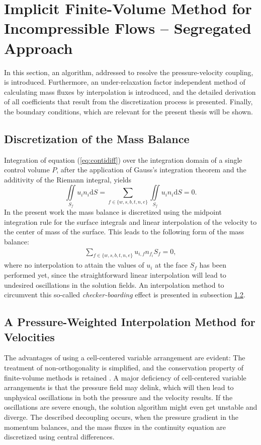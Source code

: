\section{Implicit Finite-Volume Method for Incompressible Flows -- Segregated Approach}
\label{sec:seg}
In this section, an algorithm, addressed to resolve the pressure-velocity coupling, is introduced. Furthermore, an under-relaxation factor independent method of calculating mass fluxes by interpolation is introduced, and the detailed derivation of all coefficients that result from the discretization process is presented. Finally, the boundary conditions, which are relevant for the present thesis will be shown.

\subsection{Discretization of the Mass Balance}

Integration of equation (\ref{eq:contidiff}) over the integration domain of a single control volume \(P\), after the application of Gauss's integration theorem and the additivity of the Riemann integral, yields
\begin{displaymath}
  \iint\limits_{S_f} u_i n_i \mathrm{d}S = \sum_{f \in \{w,s,b,t,n,e\}} \iint\limits_{S_f} u_i n_{i} \mathrm{d}S = 0.
\end{displaymath}
In the present work the mass balance is discretized using the midpoint integration rule for the surface integrals and linear interpolation of the velocity to the center of mass of the surface. This leads to the following form of the mass balance:
\begin{align}
  \label{eq:massbalance}
  \sum_{f \in \{w,s,b,t,n,e\}} u_{i,f} n_{f_i} S_f = 0,
\end{align}
where no interpolation to attain the values of \(u_i\) at the face \(S_f\) has been performed yet, since the straightforward linear interpolation will lead to undesired oscillations in the solution fields. An interpolation method to circumvent this so-called \emph{checker-boarding} effect is presented in subsection \ref{sec:massflux}.

\subsection{A Pressure-Weighted Interpolation Method for Velocities}
\label{sec:massflux}

The advantages of using a cell-centered variable arrangement are evident: The treatment of non-orthogonality is simplified, and the conservation property of finite-volume methods is retained \cite{choi99,majumdar88,miller88,zhang14}. A major deficiency of cell-centered variable arrangements is that the pressure field may delink, which will then lead to unphysical oscillations in both the pressure and the velocity results. If the oscillations are severe enough, the solution algorithm might even get unstable and diverge. The described decoupling occurs, when the pressure gradient in the momentum balances, and the mass fluxes in the continuity equation are discretized using central differences. 
  
